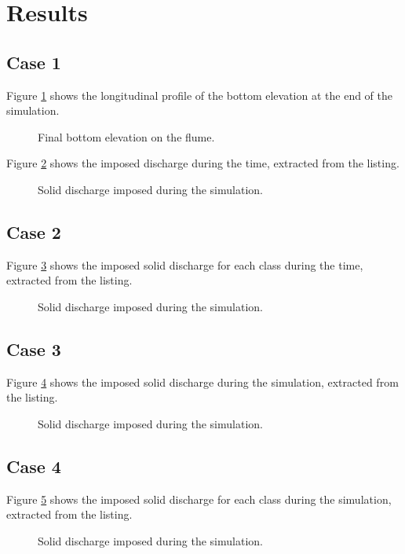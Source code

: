 \section{Results}
%
\subsection{Case 1}
%
Figure \ref{flumebc:profile} shows the longitudinal profile of the bottom elevation at the end of the simulation.
%
\begin{figure}[H]
 \centering
 \caption{Final bottom elevation on the flume.}
 \label{flumebc:profile}
\end{figure}
%
Figure \ref{flumebc:discharge1} shows the imposed discharge during the time, extracted from the listing.
%
\begin{figure}[H]
 \centering
 \caption{Solid discharge imposed during the simulation.}
 \label{flumebc:discharge1}
\end{figure}
%
\subsection{Case 2}
%
Figure \ref{flumebc:discharge2} shows the imposed solid discharge for each class during the time, extracted from the listing.
%
\begin{figure}[H]
 \centering
 \caption{Solid discharge imposed during the simulation.}
 \label{flumebc:discharge2}
\end{figure}
%
\subsection{Case 3}
%
Figure \ref{flumebc:discharge3} shows the imposed solid discharge during the simulation, extracted from the listing.
%
\begin{figure}[H]
 \centering
 \caption{Solid discharge imposed during the simulation.}
 \label{flumebc:discharge3}
\end{figure}
%
\subsection{Case 4}
%
Figure \ref{flumebc:discharge4} shows the imposed solid discharge for each class during the simulation, extracted from the listing.
%
\begin{figure}[H]
 \centering
 \caption{Solid discharge imposed during the simulation.}
 \label{flumebc:discharge4}
\end{figure}
%
